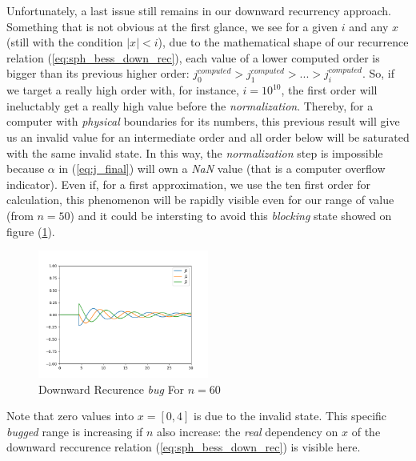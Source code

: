 \documentclass{article}
\numberwithin{equation}{section}
\begin{document}
Unfortunately, a last issue still remains in our downward recurrency approach. Something that is not obvious at the first glance, we see for a given $i$ and any $x$ (still with the condition $|x| < i$), due to the mathematical shape of our recurrence relation (\ref{eq:sph_bess_down_rec}), each value of a lower computed order is bigger than its previous higher order: $j^{computed}_{0} > j^{computed}_{1} > ... > j^{computed}_{i}$. So, if we target a really high order with, for instance, $i=10^{10}$, the first order will ineluctably get a really high value before the \textit{normalization}. Thereby, for a computer with \textit{physical} boundaries for its numbers, this previous result will give us an invalid value for an intermediate order and all order below will be saturated with the same invalid state. In this way, the \textit{normalization} step is impossible because $\alpha$ in (\ref{eq:j_final}) will own a \textit{NaN} value (that is a computer overflow indicator). Even if, for a first approximation, we use the ten first order for calculation, this phenomenon will be rapidly visible even for our range of value (from $n=50$) and it could be intersting to avoid this \textit{blocking} state showed on figure (\ref{fig:jn_bug}).
\begin{figure}[h!]
    \centering
    \includegraphics[width=0.5\textwidth, height=0.5\textwidth]{jn_bug.png}
    \caption{Downward Recurence \textit{bug} For $n=60$}
    \label{fig:jn_bug}
\end{figure}
Note that zero values into $x = [0, 4]$ is due to the invalid state. This specific \textit{bugged} range is increasing if $n$ also increase: the \textit{real} dependency on $x$ of the downward reccurence relation (\ref{eq:sph_bess_down_rec}) is visible here.
\end{document}
